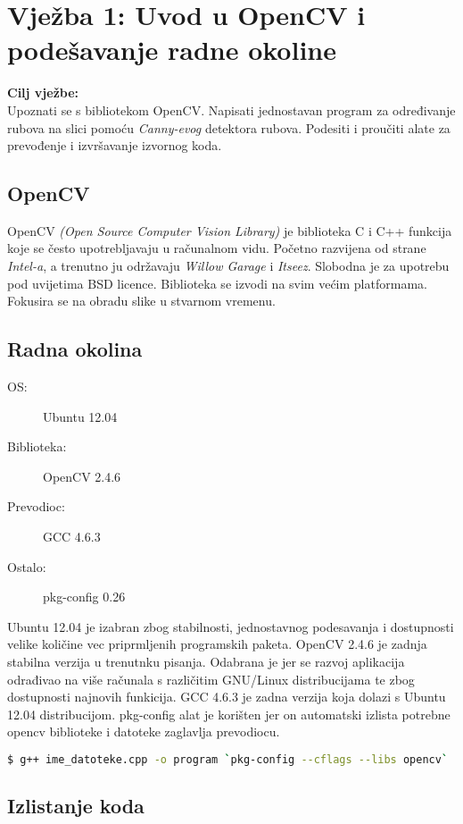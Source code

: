 \setcounter{figure}{0}
\section{Vježba 1: Uvod u OpenCV i podešavanje radne okoline}

\textbf{Cilj vježbe:}\\
Upoznati se s bibliotekom OpenCV. Napisati jednostavan program za
određivanje rubova na slici pomoću \emph{Canny-evog} detektora
rubova. Podesiti i proučiti alate za prevođenje i izvršavanje izvornog
koda.\\

\subsection{OpenCV}

OpenCV \emph{(Open Source Computer Vision Library)}
je biblioteka C i C++ funkcija koje se često upotrebljavaju u računalnom vidu. 
Početno razvijena od strane \emph{Intel-a}, a trenutno ju 
održavaju \emph{Willow Garage} i \emph{Itseez}.
Slobodna je za upotrebu pod uvijetima BSD licence. Biblioteka se izvodi na svim većim 
platformama. Fokusira se na obradu slike u stvarnom vremenu.

\subsection{Radna okolina}

\begin{description}
  \item[OS:] Ubuntu 12.04
  \item[Biblioteka:] OpenCV 2.4.6
  \item[Prevodioc:] GCC 4.6.3 
  \item[Ostalo:] pkg-config 0.26
\end{description}

Ubuntu 12.04 je izabran zbog stabilnosti, jednostavnog podesavanja i 
dostupnosti velike količine vec priprmljenih programskih paketa.
OpenCV 2.4.6 je zadnja stabilna verzija u trenutnku pisanja. Odabrana
je jer se razvoj aplikacija odrađivao na više računala s različitim 
GNU/Linux distribucijama te zbog dostupnosti najnovih funkicija.
GCC 4.6.3 je zadna verzija koja dolazi s Ubuntu 12.04 distribucijom.
pkg-config alat je korišten jer on automatski izlista potrebne
opencv biblioteke i datoteke zaglavlja prevodiocu. 
\\


\begin{lstlisting}[language=bash,caption={Pokretanje prevodioca iz terminala}]
$ g++ ime_datoteke.cpp -o program `pkg-config --cflags --libs opencv`
\end{lstlisting}

\newpage
\subsection{Izlistanje koda}

% 

